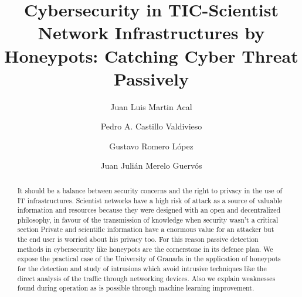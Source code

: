 \documentclass[a4paper]{llncs}
\begin{document}
\pagestyle{empty}

\mainmatter

\title{Cybersecurity in TIC-Scientist Network Infrastructures by
  Honeypots: Catching Cyber Threat Passively}
\author{Juan Luis Martin Acal \and Pedro A. Castillo Valdivieso
\and Gustavo Romero López \and Juan Julián Merelo Guervós}



\maketitle

\begin{abstract}
It should be a balance between security concerns and the right to
privacy in the use of IT infrastructures. Scientist networks have a high risk of attack as a source of valuable information and resources because they were designed with an open and decentralized philosophy, in favour of the transmission of knowledge when security wasn't a critical section\cite{iris-proyecto}
Private and scientific information have a enormous value for an attacker but the end user is worried about his privacy too. %
For this reason passive detection methods in cybersecurity like honeypots are the cornerstone in its defence plan. We expose the practical case of the University of Granada in the application of honeypots for the detection and study of intrusions which avoid intrusive techniques like the direct analysis of the traffic through networking devices. Also we explain weaknesses found during operation as is possible through machine learning improvement. 
\end{abstract}
\end{document}
